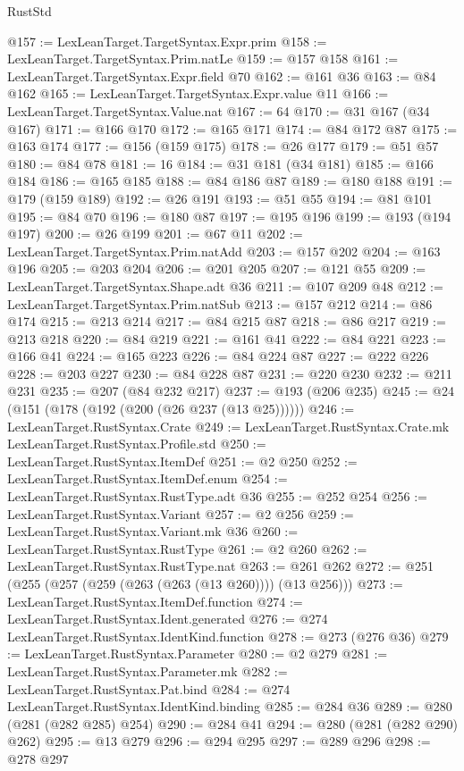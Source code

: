 \begin{lexlean}{RustStd}
\begin{coremodule}
{\begin{coremodule}
{{{{{{{{{@157 := LexLeanTarget.TargetSyntax.Expr.prim
@158 := LexLeanTarget.TargetSyntax.Prim.natLe
@159 := @157 @158
@161 := LexLeanTarget.TargetSyntax.Expr.field @70
@162 := @161 @36
@163 := @84 @162
@165 := LexLeanTarget.TargetSyntax.Expr.value @11
@166 := LexLeanTarget.TargetSyntax.Value.nat
@167 := 64
@170 := @31 @167 (@34 @167)
@171 := @166 @170
@172 := @165 @171
@174 := @84 @172 @87
@175 := @163 @174
@177 := @156 (@159 @175)
@178 := @26 @177
@179 := @51 @57
@180 := @84 @78
@181 := 16
@184 := @31 @181 (@34 @181)
@185 := @166 @184
@186 := @165 @185
@188 := @84 @186 @87
@189 := @180 @188
@191 := @179 (@159 @189)
@192 := @26 @191
@193 := @51 @55
@194 := @81 @101
@195 := @84 @70
@196 := @180 @87
@197 := @195 @196
@199 := @193 (@194 @197)
@200 := @26 @199
@201 := @67 @11
@202 := LexLeanTarget.TargetSyntax.Prim.natAdd
@203 := @157 @202
@204 := @163 @196
@205 := @203 @204
@206 := @201 @205
@207 := @121 @55
@209 := LexLeanTarget.TargetSyntax.Shape.adt @36
@211 := @107 @209 @48
@212 := LexLeanTarget.TargetSyntax.Prim.natSub
@213 := @157 @212
@214 := @86 @174
@215 := @213 @214
@217 := @84 @215 @87
@218 := @86 @217
@219 := @213 @218
@220 := @84 @219
@221 := @161 @41
@222 := @84 @221
@223 := @166 @41
@224 := @165 @223
@226 := @84 @224 @87
@227 := @222 @226
@228 := @203 @227
@230 := @84 @228 @87
@231 := @220 @230
@232 := @211 @231
@235 := @207 (@84 @232 @217)
@237 := @193 (@206 @235)
@245 := @24 (@151 (@178 (@192 (@200 (@26 @237 (@13 @25))))))
@246 := LexLeanTarget.RustSyntax.Crate
@249 := LexLeanTarget.RustSyntax.Crate.mk LexLeanTarget.RustSyntax.Profile.std
@250 := LexLeanTarget.RustSyntax.ItemDef
@251 := @2 @250
@252 := LexLeanTarget.RustSyntax.ItemDef.enum
@254 := LexLeanTarget.RustSyntax.RustType.adt @36
@255 := @252 @254
@256 := LexLeanTarget.RustSyntax.Variant
@257 := @2 @256
@259 := LexLeanTarget.RustSyntax.Variant.mk @36
@260 := LexLeanTarget.RustSyntax.RustType
@261 := @2 @260
@262 := LexLeanTarget.RustSyntax.RustType.nat
@263 := @261 @262
@272 := @251 (@255 (@257 (@259 (@263 (@263 (@13 @260)))) (@13 @256)))
@273 := LexLeanTarget.RustSyntax.ItemDef.function
@274 := LexLeanTarget.RustSyntax.Ident.generated
@276 := @274 LexLeanTarget.RustSyntax.IdentKind.function
@278 := @273 (@276 @36)
@279 := LexLeanTarget.RustSyntax.Parameter
@280 := @2 @279
@281 := LexLeanTarget.RustSyntax.Parameter.mk
@282 := LexLeanTarget.RustSyntax.Pat.bind
@284 := @274 LexLeanTarget.RustSyntax.IdentKind.binding
@285 := @284 @36
@289 := @280 (@281 (@282 @285) @254)
@290 := @284 @41
@294 := @280 (@281 (@282 @290) @262)
@295 := @13 @279
@296 := @294 @295
@297 := @289 @296
@298 := @278 @297
}}}}}}}}}
\end{coremodule}}
\end{coremodule}
\end{lexlean}
